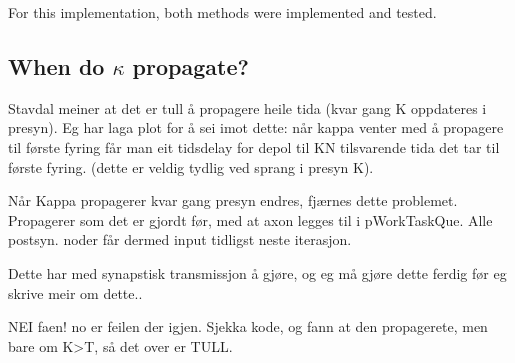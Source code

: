 	For this implementation, both methods were implemented and tested. 












\subsection{When do $\kappa$ propagate?}
Stavdal meiner at det er tull å propagere heile tida (kvar gang K oppdateres i presyn). 
Eg har laga plot for å sei imot dette: når kappa venter med å propagere til første fyring får man eit tidsdelay for depol til KN tilsvarende tida det tar til første fyring. (dette er veldig tydlig ved sprang i presyn K).

Når Kappa propagerer kvar gang presyn endres, fjærnes dette problemet. Propagerer som det er gjordt før, med at axon legges til i pWorkTaskQue. Alle postsyn. noder får dermed input tidligst neste iterasjon.

Dette har med synapstisk transmissjon å gjøre, og eg må gjøre dette ferdig før eg skrive meir om dette..

NEI faen! no er feilen der igjen. Sjekka kode, og fann at den propagerete, men bare om K>T, så det over er TULL.





















